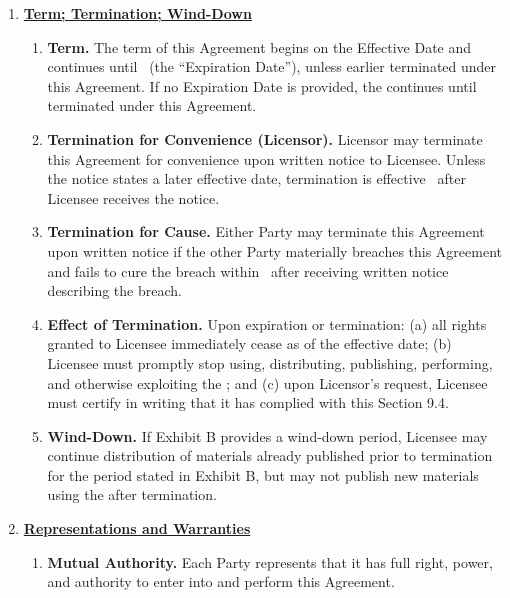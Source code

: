 \begin{enumerate}[leftmargin=*, label=\arabic*.]
	\item \textbf{\uline{Term; Termination; Wind-Down}}

	\begin{enumerate}[leftmargin=*, label=\arabic{enumi}.\arabic*]
		\item \textbf{Term.} The term of this Agreement begins on the Effective Date and
		continues until \expirationDate\ (the ``Expiration Date''), unless earlier terminated
		under this Agreement. If no Expiration Date is provided, the \termDef continues until
		terminated under this Agreement.

		\item \textbf{Termination for Convenience (Licensor).} Licensor may terminate this
		Agreement for convenience upon written notice to Licensee. Unless the notice states a
		later effective date, termination is effective \terminationNoticeDays\ after Licensee
		receives the notice.

		\item \textbf{Termination for Cause.} Either Party may terminate this Agreement upon
		written notice if the other Party materially breaches this Agreement and fails to cure
		the breach within \cureDays\ after receiving written notice describing the breach.

		\item \textbf{Effect of Termination.} Upon expiration or termination: (a) all rights
		granted to Licensee immediately cease as of the effective date; (b) Licensee must
		promptly stop using, distributing, publishing, performing, and otherwise exploiting the
		\licensedIP; and (c) upon Licensor's request, Licensee must certify in writing that it
		has complied with this Section 9.4.

		\item \textbf{Wind-Down.} If Exhibit B provides a wind-down period, Licensee may continue
		distribution of \project materials already published prior to termination for the period
		stated in Exhibit B, but may not publish new materials using the \licensedIP after
		termination.
	\end{enumerate}

	\item \textbf{\uline{Representations and Warranties}}

	\begin{enumerate}[leftmargin=*, label=\arabic{enumi}.\arabic*]
		\item \textbf{Mutual Authority.} Each Party represents that it has full right, power, and
		authority to enter into and perform this Agreement.


\end{enumerate}
\end{enumerate}
